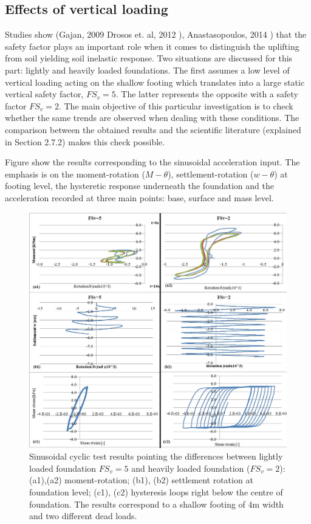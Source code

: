 \subsection{Effects of vertical loading}
Studies show (Gajan, 2009 \cite{gajan2009effects} Drosos et. al, 2012 \cite{drosos2012soil}), Anastasopoulos, 2014 \cite{anastasopoulos2014simplified}) that the safety factor plays an important role when it comes to distinguish the uplifting from soil yielding soil inelastic response. Two situations are discussed for this part: lightly and heavily loaded foundations. The first assumes a low level of vertical loading acting on the shallow footing which translates into a large static vertical safety factor, $FS_v=5$. The latter represents the opposite with a safety factor $FS_v=2.$ The main objective of this particular investigation is to check whether the same trends are observed when dealing with these conditions. The comparison between the obtained results and the scientific literature (explained in Section 2.7.2) makes this check possible.

Figure show the results corresponding to the sinusoidal acceleration input. The emphasis is on the moment-rotation ($M-\theta$), settlement-rotation ($w-\theta$) at footing level, the hysteretic response underneath the foundation and the acceleration recorded at three main points: base, surface and mass level.

\begin{figure}
		\centering
		\includegraphics[width=0.7\linewidth]{"sin_4m"}
		\caption{Sinusoidal cyclic test results pointing the differences between lightly loaded foundation $FS_v=5$ and heavily loaded foundation ($FS_v=2$): (a1),(a2) moment-rotation; (b1), (b2) settlement rotation at foundation level; (c1), (c2) hysteresis loops right below the centre of foundation. The results correspond to a shallow footing of 4m width and two different dead loads.}
		\label{sin}
\end{figure}

